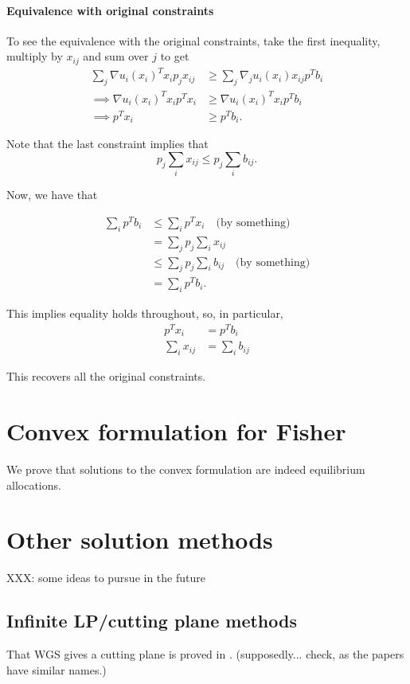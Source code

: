 \documentclass[12pt]{article}
\begin{document}
\paragraph{Equivalence with original constraints}
To see the equivalence with the original constraints, take the first inequality,
multiply by $x_{ij}$ and sum over $j$ to get
\begin{align*}
\sum_j \nabla u_i(x_i)^T x_i p_j x_{ij} &\geq \sum_j \nabla_j u_i(x_i) x_{ij} p^T b_i \\
\implies \nabla u_i(x_i)^T x_i p^T x_i &\geq \nabla u_i(x_i)^T x_i p^T b_i \\
\implies p^T x_i &\geq p^T b_i.
\end{align*}

Note that the last constraint implies that
\[
p_j \sum_i x_{ij} \leq p_j \sum_i b_{ij}.
\]

Now, we have that

\begin{align*}
\sum_i p^T b_i &\leq \sum_i p^T x_i\quad \text{(by something)}\\
&= \sum_j p_j \sum_i x_{ij} \\
&\leq \sum_j p_j \sum_i b_{ij}\quad \text{(by something)}\\
&= \sum_i p^T b_i.
\end{align*}

This implies equality holds throughout, so, in particular,
\begin{align*}
p^T x_i &= p^T b_i\\
\sum_i x_{ij} &= \sum_i b_{ij}
\end{align*}

This recovers all the original constraints.

\section{Convex formulation for Fisher}
\label{sec:fisher_proof}
We prove that solutions to the convex formulation %
are indeed equilibrium allocations.


\section{Other solution methods}
XXX: some ideas to pursue in the future

\subsection{Infinite LP/cutting plane methods}
That WGS gives a cutting plane is proved in \cite{arrow1959stability}.
(supposedly... check, as the papers have similar names.)
\end{document}
